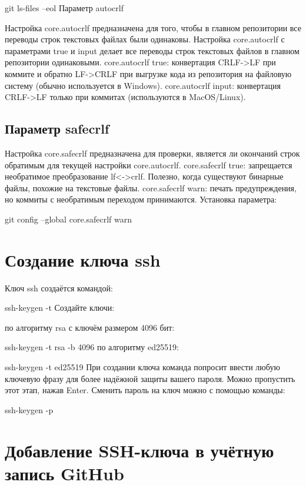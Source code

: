 \documentclass[
  english,
  russian,
  12pt,
  a4paper,
  DIV=11,
  numbers=noendperiod]{scrreprt}
\begin{document}
git ls-files --eol Параметр autocrlf

Настройка core.autocrlf предназначена для того, чтобы в главном
репозитории все переводы строк текстовых файлах были одинаковы.
Настройка core.autocrlf с параметрами true и input делает все переводы
строк текстовых файлов в главном репозитории одинаковыми. core.autocrlf
true: конвертация CRLF-\textgreater LF при коммите и обратно
LF-\textgreater CRLF при выгрузке кода из репозитория на файловую
систему (обычно используется в Windows). core.autocrlf input:
конвертация CRLF-\textgreater LF только при коммитах (используются в
MacOS/Linux).

\subsection{Параметр
safecrlf}\label{ux43fux430ux440ux430ux43cux435ux442ux440-safecrlf}

Настройка core.safecrlf предназначена для проверки, является ли
окончаний строк обратимым для текущей настройки core.autocrlf.
core.safecrlf true: запрещается необратимое преобразование
lf\textless-\textgreater crlf. Полезно, когда существуют бинарные файлы,
похожие на текстовые файлы. core.safecrlf warn: печать предупреждения,
но коммиты с необратимым переходом принимаются. Установка параметра:

git config --global core.safecrlf warn

\section{Создание ключа
ssh}\label{ux441ux43eux437ux434ux430ux43dux438ux435-ux43aux43bux44eux447ux430-ssh}

Ключ ssh создаётся командой:

ssh-keygen -t Создайте ключи:

по алгоритму rsa с ключём размером 4096 бит:

ssh-keygen -t rsa -b 4096 по алгоритму ed25519:

ssh-keygen -t ed25519 При создании ключа команда попросит ввести любую
ключевую фразу для более надёжной защиты вашего пароля. Можно пропустить
этот этап, нажав Enter. Сменить пароль на ключ можно с помощью команды:

ssh-keygen -p

\section{Добавление SSH-ключа в учётную запись
GitHub}\label{ux434ux43eux431ux430ux432ux43bux435ux43dux438ux435-ssh-ux43aux43bux44eux447ux430-ux432-ux443ux447ux451ux442ux43dux443ux44e-ux437ux430ux43fux438ux441ux44c-github}
\end{document}
